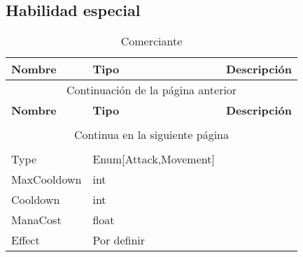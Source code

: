 \subsection{Habilidad especial}

\begin{longtable}[H]{
    @{}
    l
    l
    l
    @{}
    }%

    \toprule        %
    \textbf{Nombre} & \textbf{Tipo} & \textbf{Descripción} \\      %
    \midrule        %
    \endfirsthead   %

    \multicolumn{3}{c}{Continuación de la página anterior}\\
    \toprule
    \textbf{Nombre} & \textbf{Tipo} & \textbf{Descripción} \\\\      %
    \midrule        %
    \endhead        %

    \midrule
    \multicolumn{3}{c}{Continua en la siguiente página}\\ %
    \endfoot        %

    \bottomrule
    \caption{Comerciante \label{tab:entidad_habilidad_especial}} \\
    \endlastfoot    %

    Type                & Enum[Attack,Movement]  & \\
    MaxCooldown         & int                    & \\
    Cooldown            & int                    & \\
    ManaCost            & float                  & \\
    Effect              & Por definir            & \\
\end{longtable}